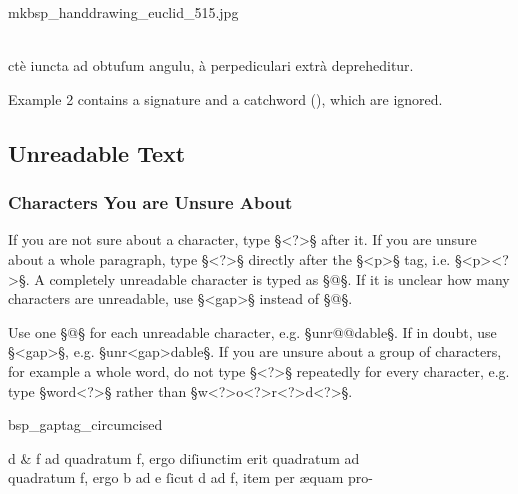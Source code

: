 \begin{sampleImage}{mkbsp_handdrawing_euclid_515.jpg}
\begin{typeLatin}
 \someText \\
ctè iuncta ad obtuſum angul\bs\tld{}u, à perp\bs\tld{}ediculari extrà depreh\bs\tld{}editur.\\
\end{typeLatin}

\end{sampleImage}

\begin{crossref}
Example 2 contains a signature and a catchword (), which are ignored.
\end{crossref}


\tocspace
\subsection{Unreadable Text}
\label{section unreadable text}

\subsubsection{Characters You are Unsure About}
\label{section characters you are unsure about}

\begin{mainrule}
If you are not sure about a character, type §<?>§ after it. If you are unsure about a whole paragraph, type §<?>§ directly after the §<p>§ tag, i.e. §<p><?>§. A completely unreadable character is typed as §@§. If it is unclear how many characters are unreadable, use §<gap>§ instead of §@§.
\end{mainrule}

\begin{clarification}
Use one §@§ for each unreadable character, e.g. §unr@@dable§. If in doubt, use §<gap>§, e.g. §unr<gap>dable§. If you are unsure about a group of characters, for example a whole word, do not type §<?>§ repeatedly for every character, e.g. type §word<?>§ rather than §w<?>o<?>r<?>d<?>§.
\end{clarification}

\vspace{2mm}
\begin{sampleImage}[ 1: \, a stain]{bsp_gaptag_circumcised}
\begin{typeLatin}
 \someText
d & f ad quadratum f, ergo diſiunctim erit quadratum  ad\\
quadratum f, ergo b ad e ſicut d ad f, item per æquam pro-\\
\someText {}
\end{typeLatin}

\end{sampleImage}

